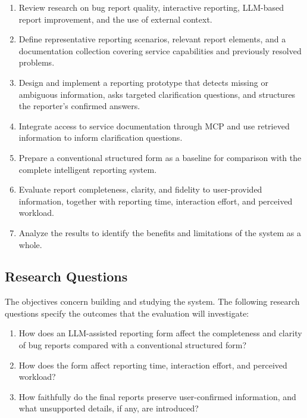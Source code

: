 \begin{enumerate}
    \item Review research on bug report quality, interactive reporting, LLM-based report improvement, and the use of external context.
    \item Define representative reporting scenarios, relevant report elements, and a documentation collection covering service capabilities and previously resolved problems.
    \item Design and implement a reporting prototype that detects missing or ambiguous information, asks targeted clarification questions, and structures the reporter's confirmed answers.
    \item Integrate access to service documentation through MCP and use retrieved information to inform clarification questions.
    \item Prepare a conventional structured form as a baseline for comparison with the complete intelligent reporting system.
    \item Evaluate report completeness, clarity, and fidelity to user-provided information, together with reporting time, interaction effort, and perceived workload.
    \item Analyze the results to identify the benefits and limitations of the system as a whole.
\end{enumerate}

\subsection{Research Questions}
\label{sec:research-questions}

The objectives concern building and studying the system. The following research questions specify the outcomes that the evaluation will investigate:

\begin{enumerate}[label=\textbf{RQ\arabic*:},leftmargin=*]
    \item \label{rq:quality} How does an LLM-assisted reporting form affect the completeness and clarity of bug reports compared with a conventional structured form?
    \item \label{rq:effort} How does the form affect reporting time, interaction effort, and perceived workload?
    \item \label{rq:fidelity} How faithfully do the final reports preserve user-confirmed information, and what unsupported details, if any, are introduced?
\end{enumerate}

